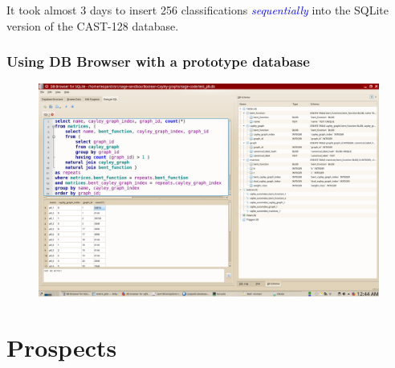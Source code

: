 \documentclass[pdf,sprung,slideColor,nocolorBG]{beamer}
\newenvironment{colortheme}[1]{
\def\ProvidesPackageRCS $##1${\relax}
\renewcommand{\ProcessOptions}{\relax}
\makeatletter

\makeatother
}{}
\newcommand{\Emph}[1]{\emph{\textcolor{blue}{#1}}}
\begin{document}
\begin{colortheme}{jubata}
\begin{frame}
\begin{figure}
\begin{minipage}{.49\textwidth}
  \label{fig:CAST128_database_insert_times-By_time_of_day}
\end{minipage}%
\end{figure}
It took almost 3 days to insert 256 classifications \Emph{sequentially} into the SQLite version of the CAST-128 database.
\end{frame}

\begin{frame}
\frametitle{Using DB Browser with a prototype database}
\begin{figure}
\centering
\begin{minipage}{\textwidth}
  \centering
\includegraphics[width=1.00\linewidth]{Browser-session-SQLite.png}
  \label{fig:Browser_session_SQLite}
\end{minipage}%
\end{figure}
\end{frame}

\end{colortheme}

\section{Prospects}
\end{document}
